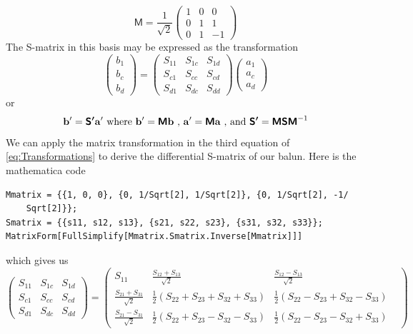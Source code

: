 \documentclass[preprint]{aastex}
\begin{document}
\begin{equation}
{\boldsymbol{\mathsf{M}}}=\frac{1}{\sqrt{2}}\begin{pmatrix} 1 & 0 & 0 \\ 0 & 1 & 1 \\ 0 & 1 & -1\end{pmatrix}
\end{equation}
The S-matrix in this basis may be expressed as the transformation 
\begin{equation}\label{eq:SMatrixDifferential}
\begin{pmatrix} b_1 \\ b_c \\ b_d \end{pmatrix} = \begin{pmatrix} S_{11} & S_{1c} & S_{1d} \\
				S_{c1} & S_{cc} & S_{cd} \\
				S_{d1} & S_{dc} & S_{dd} \end{pmatrix} \begin{pmatrix} a_1 \\ a_c \\ a_d \end{pmatrix}
\end{equation}
or
\begin{equation}\label{eq:Transformations}
{\bf b^\prime} = \boldsymbol{\mathsf{S}^\prime} {\bf a^\prime} \text{ where }
{\bf b^\prime} = \boldsymbol{\mathsf{M}} {\bf b} \text{ , }
{\bf a^\prime} = \boldsymbol{\mathsf{M}} {\bf a} \text{ , and }
\boldsymbol{\mathsf{S}^\prime} = \boldsymbol{\mathsf{M}} \boldsymbol{\mathsf{S}}\boldsymbol{\mathsf{M}}^{-1}
\end{equation}
We can apply the matrix transformation in the third equation of \ref{eq:Transformations} to derive the differential S-matrix of our balun. Here is the mathematica code
\begin{verbatim}
Mmatrix = {{1, 0, 0}, {0, 1/Sqrt[2], 1/Sqrt[2]}, {0, 1/Sqrt[2], -1/
    Sqrt[2]}};
Smatrix = {{s11, s12, s13}, {s21, s22, s23}, {s31, s32, s33}};
MatrixForm[FullSimplify[Mmatrix.Smatrix.Inverse[Mmatrix]]]
\end{verbatim}
which gives us
\begin{equation}\label{eq:SMatrixBal2uBal}
\begin{pmatrix} S_{11} & S_{1c} & S_{1d} \\
				S_{c1} & S_{cc} & S_{cd} \\
				S_{d1} & S_{dc} & S_{dd} \end{pmatrix} = \begin{pmatrix} S_{11} & \frac{S_{12}+S_{13}}{\sqrt{2}} & \frac{S_{12}-S_{13}}{\sqrt{2}} \\ \frac{S_{21}+S_{31}}{\sqrt{2}} & \frac{1}{2} \left( S_{22}+S_{23}+S_{32}+S_{33}\right)& \frac{1}{2}\left(S_{22}-S_{23}+S_{32}-S_{33} \right) &\\
\frac{S_{21}-S_{31}}{\sqrt{2}} & \frac{1}{2}\left(S_{22}+S_{23}-S_{32}-S_{33}\right) & \frac{1}{2} \left(S_{22} - S_{23} - S_{32} + S_{33}\right) \end{pmatrix}
\end{equation}
\end{document}
